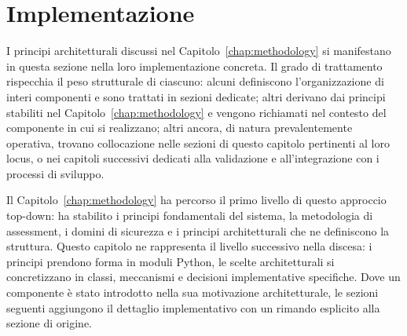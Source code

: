 ﻿%
%
%
%
%
%

\chapter{Implementazione}\label{chap:implementation}

I principi architetturali discussi nel Capitolo~\ref{chap:methodology} si manifestano in questa sezione nella loro implementazione concreta. Il grado di trattamento rispecchia il peso strutturale di ciascuno: alcuni definiscono l'organizzazione di interi componenti e sono trattati in sezioni dedicate; altri derivano dai principi stabiliti nel Capitolo~\ref{chap:methodology} e vengono richiamati nel contesto del componente in cui si realizzano; altri ancora, di natura prevalentemente operativa, trovano collocazione nelle sezioni di questo capitolo pertinenti al loro locus, o nei capitoli successivi dedicati alla validazione e all'integrazione con i processi di sviluppo.

Il Capitolo~\ref{chap:methodology} ha percorso il primo livello di questo approccio top-down: ha stabilito i principi fondamentali del sistema, la metodologia di assessment, i domini di sicurezza e i principi architetturali che ne definiscono la struttura. Questo capitolo ne rappresenta il livello successivo nella discesa: i principi prendono forma in moduli Python, le scelte architetturali si concretizzano in classi, meccanismi e decisioni implementative specifiche. Dove un componente è stato introdotto nella sua motivazione architetturale, le sezioni seguenti aggiungono il dettaglio implementativo con un rimando esplicito alla sezione di origine.
